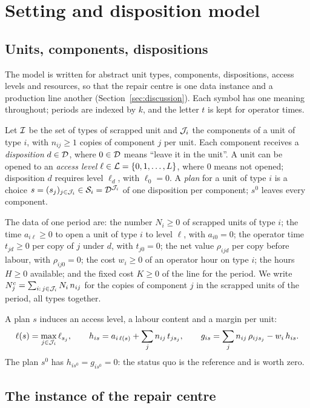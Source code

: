 \section{Setting and disposition model}\label{sec:model}

\subsection{Units, components, dispositions}

The model is written for abstract unit types, components, dispositions, access levels and resources, so that the
repair centre is one data instance and a production line another (Section~\ref{sec:discussion}). Each symbol has one
meaning throughout; periods are indexed by $k$, and the letter $t$ is kept for operator times.

Let $\mathcal{I}$ be the set of types of scrapped unit and $\mathcal{J}_i$ the components of a unit of type $i$, with $n_{ij}\ge 1$
copies of component $j$ per unit. Each component receives a \emph{disposition} $d\in\mathcal{D}$, where $0\in\mathcal{D}$ means
``leave it in the unit''. A unit can be opened to an \emph{access level} $\ell\in\mathcal{L}=\{0,1,\dots,L\}$, where $0$
means not opened; disposition $d$ requires level $\ell_d$, with $\ell_0=0$. A \emph{plan} for a unit of type $i$ is a
choice $s=(s_j)_{j\in\mathcal{J}_i}\in\mathcal{S}_i=\mathcal{D}^{\mathcal{J}_i}$ of one disposition per component; $s^0$ leaves every component.

The data of one period are: the number $N_i\ge 0$ of scrapped units of type $i$; the time $a_{i\ell}\ge 0$ to open a
unit of type $i$ to level $\ell$, with $a_{i0}=0$; the operator time $t_{jd}\ge 0$ per copy of $j$ under $d$, with
$t_{j0}=0$; the net value $\rho_{ijd}$ per copy before labour, with $\rho_{ij0}=0$; the cost $w_i\ge0$ of an operator
hour on type $i$; the hours $H\ge0$ available; and the fixed cost $K\ge 0$ of the line for the period. We write
$N^{c}_j=\sum_{i:\,j\in\mathcal{J}_i}N_i\,n_{ij}$ for the copies of component $j$ in the scrapped units of the period, all
types together.

A plan $s$ induces an access level, a labour content and a margin per unit:
\begin{equation}\label{eq:plan}
\ell(s)=\max_{j\in\mathcal{J}_i}\ell_{s_j},\qquad h_{is}=a_{i\,\ell(s)}+\sum_{j}n_{ij}\,t_{js_j},\qquad
g_{is}=\sum_{j}n_{ij}\,\rho_{ijs_j}-w_i\,h_{is}.
\end{equation}
The plan $s^0$ has $h_{is^0}=g_{is^0}=0$: the status quo is the reference and is worth zero.

\subsection{The instance of the repair centre}

